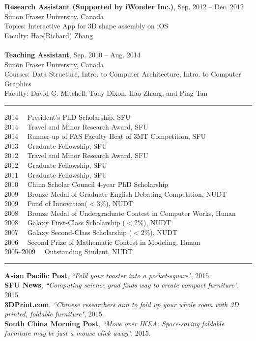 \documentclass[10pt]{article}
\newcommand{\myRule}{\textcolor{gray}{\rule[2.5mm]{18cm}{1.5pt}}}
\newcommand{\head}[1]{\vspace{5mm}{\textbf{\textit{{\Large #1}}}}{\newline}\myRule}
\begin{document}
	\textbf{Research Assistant (Supported by iWonder Inc.)}, {Sep. 2012 -- Dec. 2012}\\
	{Simon Fraser University}, {Canada}\\
	{Topics: Interactive App for 3D shape assembly on iOS}\\
	{Faculty: Hao(Richard) Zhang}
	\\
	\\
	\textbf{Teaching Assistant}, {Sep. 2010 -- Aug. 2014}\\
	{Simon Fraser University}, {Canada}\\
	{Courses: Data Structure, Intro. to Computer Architecture, Intro. to Computer Graphics}\\
	{Faculty: David G. Mitchell, Tony Dixon, Hao Zhang, and Ping Tan}\\


\head{Awards \& Honors}

	2014~~ {President's PhD Scholarship, SFU} \\
	2014~~ {Travel and Minor Research Award, SFU }\\
	2014~~ {Runner-up of FAS Faculty Heat of 3MT Competition, SFU }\\
	2013~~ {Graduate Fellowship, SFU }\\
	2012~~ {Travel and Minor Research Award, SFU }\\
	2012~~ {Graduate Fellowship, SFU }\\
	2011~~ {Graduate Fellowship, SFU }\\
	2010~~ {China Scholar Council 4-year PhD Scholarship}\\
	2009~~ {Bronze Medal of Graduate English Debating Competition, NUDT }\\
	2009~~ {Fund of Innovation($<$3\%), NUDT}\\
	2008~~ {Bronze Medal of Undergraduate Contest in Computer Works, Hunan }\\
	2008~~ {Galaxy First-Class Scholarship ($<$2\%), NUDT }\\
	2007~~ {Galaxy Second-Class Scholarship ($<$2\%), NUDT }\\
	2006~~ {Second Prize of Mathematic Contest in Modeling, Hunan}\\
	2005--2009~~ {Outstanding Student, NUDT }\\


\head{Press}

	\textbf{Asian Pacific Post}, \textit{``Fold your toaster into a pocket-square"}, 2015. \\
	\textbf{SFU News}, \textit{``Computing science grad finds way to create compact furniture"}, 2015.\\
	\textbf{3DPrint.com}, \textit{``Chinese researchers aim to fold up your whole room with 3D printed, foldable furniture"}, 2015. \\
	\textbf{South China Morning Post}, \textit{``Move over IKEA: Space-saving foldable furniture may be just a mouse click away"}, 2015.
\end{document}
